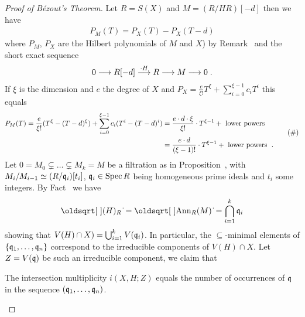 \documentclass[a4paper,parskip=half,numbers=enddot, DIV=12]{scrreprt}
\begin{document}
\begin{proof}[Proof of B\'ezout's Theorem]
    Let $R=S(X)$ and $M=(R/HR)[-d]$ then we have
    \begin{align*}
        P_M(T) = P_X(T) - P_X(T-d)
    \end{align*}
    where $P_M$, $P_X$ are the Hilbert polynomials of $M$ and $X$) by Remark~ and the short exact sequence
    \begin{align*}
        0\morphism R[-d] \morphism[\cdot H]R \morphism M \morphism 0\;.
    \end{align*}
    If $\xi$ is the dimension and $e$ the degree of $X$ and $P_X=\frac{e}{\xi!}T^\xi+\sum_{i=0}^{\xi-1}c_iT^i$ this equals
    \begin{align*}
    \begin{split}
        P_M(T)=\frac{e}{\xi!}(T^\xi-(T-d)^\xi) + \sum_{i=0}^{\xi-1} c_i(T^i- (T-d)^i) &= \frac{e\cdot d\cdot \xi}{\xi!}\cdot T^{\xi-1} + \text{ lower powers } \\
        &= \frac{e\cdot d}{(\xi-1)!}\cdot T^{\xi-1} +\text{ lower powers }\;.
        \end{split}\tag{\#}\lbl{eq:bezout}
    \end{align*}
    Let $0=M_0\subsetneq \ldots \subsetneq M_k = M$ be a filtration as in Proposition~, with $M_i/M_{i-1} \simeq (R/\mathfrak{q}_i)[t_i]$, $\mathfrak{q}_i\in\operatorname{Spec} R$ being homogeneous prime ideals and $t_i$ some integers. By Fact~ we have    
    \begin{align*}
        \sqrt{(H)_R} = \sqrt{\Ann_R(M)} = \bigcap_{i=1}^k \qq_i
    \end{align*}
    showing that $V(H)\cap X) = \bigcup_{i=1}^k V(\mathfrak{q}_i)$. In particular, the $\subseteq$-minimal elements of $\{\mathfrak{q}_1,\ldots,\mathfrak{q}_n\}$ correspond to the irreducible components of $V(H)\cap X$. Let $Z=V(\mathfrak{q})$ be such an irreducible component, we claim that 
    \begin{claim}
    	The intersection multiplicity $i(X,H;Z)$ equals the number of occurrences of $\mathfrak{q}$ in the sequence $(\mathfrak{q}_1,\ldots,\mathfrak{q}_n)$.
    \end{claim}
    

\end{proof}
\end{document}
